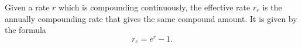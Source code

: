 \begin{definition}
    Given a rate \(r\) which is compounding continuously, the effective rate \(r_e\) is the annually compounding rate that gives the same compound amount. It is given by the formula
    \[r_e = e^r-1.\]
\end{definition}
